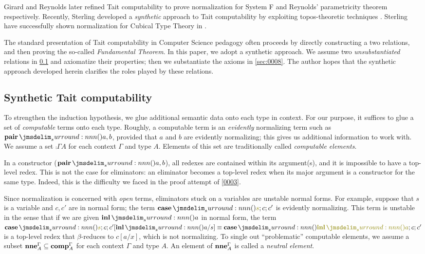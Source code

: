 \documentclass[a4paper]{article}
\begin{document}
Girard and Reynolds later refined Tait computability to prove normalization for System F \cite{Girard89} and Reynolds' parametricity theorem \cite{Reynolds83} respectively.
Recently, Sterling developed a \emph{synthetic} approach to Tait computability by exploiting topos-theoretic techniques \cite{Sterling22}.
Sterling \etal have successfully shown normalization for Cubical Type Theory in \opcit.

The standard presentation of Tait computability in Computer Science pedagogy often proceeds by directly constructing a two relations, and then proving the so-called \emph{Fundamental Theorem}.
In this paper, we adopt a synthetic approach.
We assume two \emph{unsubstantiated} relations in \cref{sec:0108} and axiomatize their properties; then we substantiate the axioms in \cref{sec:0008}.
The author hopes that the synthetic approach developed herein clarifies the roles played by these relations.

\subsection{Synthetic Tait computability}
\label{sec:0108}

To strengthen the induction hypothesis, we glue additional semantic data onto each type in context.
For our purpose, it suffices to glue a set of \emph{computable} terms onto each type.
Roughly, a computable term is an \emph{evidently} normalizing term such as $\tmPair{a}{b}$, provided that $a$ and $b$ are evidently normalizing; this gives us additional information to work with.
We assume a set $\comp{\Gamma}{A}$ for each context $\Gamma$ and type $A$.
Elements of this set are traditionally called \emph{computable elements}.

In a constructor (\eg $\tmPair{a}{b}$), all redexes are contained within its argument(s), and it is impossible to have a top-level redex.
This is not the case for eliminators: an eliminator becomes a top-level redex when its major argument is a constructor for the same type.
Indeed, this is the difficulty we faced in the proof attempt of \cref{0003}.

Since normalization is concerned with \emph{open} terms, eliminators stuck on a variables are unstable normal forms.
For example, suppose that $s$ is a variable and $c, c'$ are in normal form; the term $\tmCase{s}{c}{c'}$ is evidently normalizing.
This term is unstable in the sense that if we are given $\tmInl{a}$ in normal form, the term $\tmCase{s}{c}{c'}[\tmInl{a}/s] \equiv \tmCase{\tmInl{a}}{c}{c'}$ is a top-level redex that $\beta$-reduces to $c[a/x]$, which is not \apriori normalizing.
To single out ``problematic'' computable elements, we assume a subset $\operatorname{\mathbf{nne}}^{\Gamma}_{A} \subseteq \operatorname{\mathbf{comp}}^{\Gamma}_{A}$ for each context $\Gamma$ and type $A$.
An element of $\operatorname{\mathbf{nne}}^{\Gamma}_{A}$ is called a \emph{neutral element}.
\end{document}
